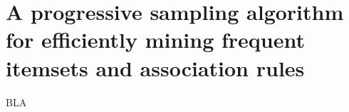 \chapter{A progressive sampling algorithm for efficiently mining frequent
itemsets and association rules}\label{ch:shatterfi}
BLA

